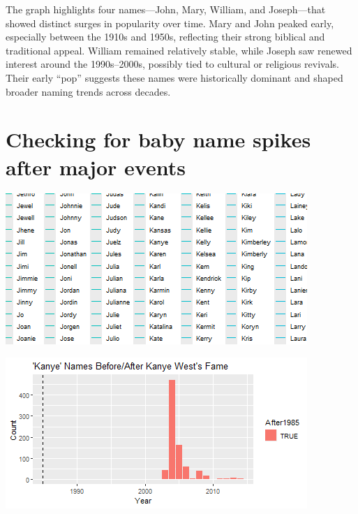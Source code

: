 \documentclass[11pt,preprint]{elsarticle}
\let\origfigure\figure
\let\endorigfigure\endfigure
\renewenvironment{figure}[1][2] {
    \expandafter\origfigure\expandafter[H]
} {
    \endorigfigure
}
\numberwithin{equation}{section}
\numberwithin{figure}{section}
\numberwithin{table}{section}
\begin{document}
The graph highlights four names---John, Mary, William, and Joseph---that
showed distinct surges in popularity over time. Mary and John peaked
early, especially between the 1910s and 1950s, reflecting their strong
biblical and traditional appeal. William remained relatively stable,
while Joseph saw renewed interest around the 1990s--2000s, possibly tied
to cultural or religious revivals. Their early ``pop'' suggests these
names were historically dominant and shaped broader naming trends across
decades.

\newpage

\section{Checking for baby name spikes after major
events}\label{checking-for-baby-name-spikes-after-major-events}

\begin{figure}[H]

{\centering \includegraphics{23034103_Q1USbabynames_files/figure-latex/Figure 3a-1}

}

\caption{Caption Here \label{Figure1}}\label{fig:Figure 3a-1}
\end{figure}
\begin{figure}[H]

{\centering \includegraphics{23034103_Q1USbabynames_files/figure-latex/Figure 3a-2}

}

\caption{Caption Here \label{Figure1}}\label{fig:Figure 3a-2}
\end{figure}
\end{document}
